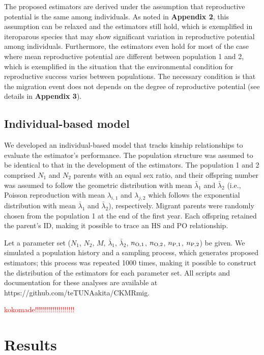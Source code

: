 \documentclass[12pt, English]{article}
\def\RED#1{\textcolor{red}{#1}} %
\begin{document}
\begin{spacing}{1.9}
The proposed estimators are derived under the assumption that reproductive potential is the same among individuals. As noted in {\bf Appendix 2}, this assumption can be relaxed and the estimators still hold, which is exemplified in iteroparous species that may show significant variation in reproductive potential among individuals. Furthermore, the estimators even hold for most of the case where mean reproductive potential are different between population 1 and 2, which is exemplified in the situation that the environmental condition for reproductive success varies between populations. The necessary condition is that the migration event does not depends on the degree of reproductive potential (see details in  {\bf Appendix 3}). 

\subsection{Individual-based model}

We developed an individual-based model that tracks kinship relationships to evaluate the estimator's performance. The population structure was assumed to be identical to that in the development of the estimators. The population 1 and 2 comprised $N_1$ and $N_2$ parents with an equal sex ratio, and their offspring number was assumed to follow the geometric distribution with mean ${\bar \lambda_1}$ and ${\bar \lambda_2}$ (i.e., Poisson reproduction with mean $\lambda_{i,1}$ and $\lambda_{j,2}$ which follows the exponential distribution with mean ${\bar \lambda_1}$ and ${\bar \lambda_2}$), respectively. Migrant parents were randomly chosen from the population 1 at the end of the first year. Each offspring retained the parent's ID, making it possible to trace an HS and PO relationship.

Let a parameter set ($N_1$, $N_2$, $M$, ${\bar \lambda_1}$, ${\bar \lambda_2}$, $n_{\rm O,1}$, $n_{\rm O,2}$, $n_{\rm P,1}$, $n_{\rm P,2}$) be given. We simulated a population history and a sampling process, which generates proposed estimators; this process was repeated 1000 times, making it possible to construct the distribution of the estimators for each parameter set. All scripts and documentation for these analyses are available at \\https://github.com/teTUNAakita/CKMRmig.

\RED{kokomade!!!!!!!!!!!!!!!!!!!!}

\section{Results}\label{sec3}


\end{spacing}
\end{document}
